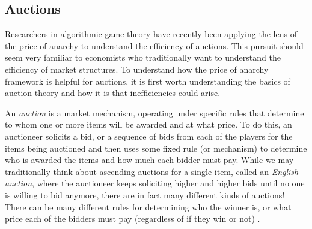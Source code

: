 \documentclass[12pt,twoside]{reedthesis}
\begin{document}
\label{sec:routinggames}

\subsection{Auctions}
Researchers in algorithmic game theory have recently been applying the lens of the price of anarchy to understand the efficiency of auctions. This pursuit should seem very familiar to economists who traditionally want to understand the efficiency of market structures. To understand how the price of anarchy framework is helpful for auctions, it is first worth understanding the basics of auction theory and how it is that inefficiencies could arise. 

An \textit{auction} is a market mechanism, operating under specific rules that determine to whom one or more items will be awarded and at what price. To do this, an auctioneer solicits a bid, or a sequence of bids from each of the players for the items being auctioned and then uses some fixed rule (or mechanism) to determine who is awarded the items and how much each bidder must pay. While we may traditionally think about ascending auctions for a single item, called an {\em English auction}, where the auctioneer keeps soliciting higher and higher bids until no one is willing to bid anymore, there are in fact many different kinds of auctions! There can be many different rules for determining who the winner is, or what price each of the bidders must pay (regardless of if they win or not) \citep{Mochon2015}.
\end{document}
